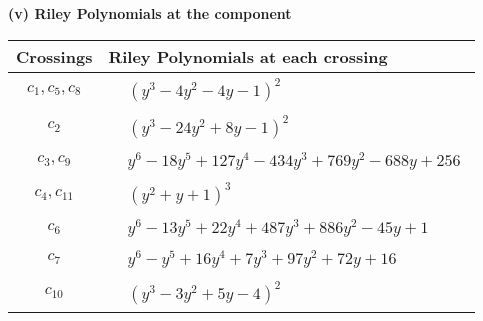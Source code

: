 \documentclass[1p]{elsarticle_modified}
\theoremstyle{definition}
\begin{document}
\newpage\renewcommand{\arraystretch}{1}
\flushleft \textbf{(v) Riley Polynomials at the component}\newline \\
\begin{tabular}{m{50pt}|m{274pt}}
Crossings & \hspace{64pt}Riley Polynomials at each crossing \\
\hline $$\begin{aligned}c_{1},c_{5},c_{8}\end{aligned}$$&$\begin{aligned}
&(y^3-4 y^2-4 y-1)^2
\end{aligned}$\\
\hline $$\begin{aligned}c_{2}\end{aligned}$$&$\begin{aligned}
&(y^3-24 y^2+8 y-1)^2
\end{aligned}$\\
\hline $$\begin{aligned}c_{3},c_{9}\end{aligned}$$&$\begin{aligned}
&y^6-18 y^5+127 y^4-434 y^3+769 y^2-688 y+256
\end{aligned}$\\
\hline $$\begin{aligned}c_{4},c_{11}\end{aligned}$$&$\begin{aligned}
&(y^2+y+1)^3
\end{aligned}$\\
\hline $$\begin{aligned}c_{6}\end{aligned}$$&$\begin{aligned}
&y^6-13 y^5+22 y^4+487 y^3+886 y^2-45 y+1
\end{aligned}$\\
\hline $$\begin{aligned}c_{7}\end{aligned}$$&$\begin{aligned}
&y^6- y^5+16 y^4+7 y^3+97 y^2+72 y+16
\end{aligned}$\\
\hline $$\begin{aligned}c_{10}\end{aligned}$$&$\begin{aligned}
&(y^3-3 y^2+5 y-4)^2
\end{aligned}$\\
\hline
\end{tabular}\\~\\
\end{document}
